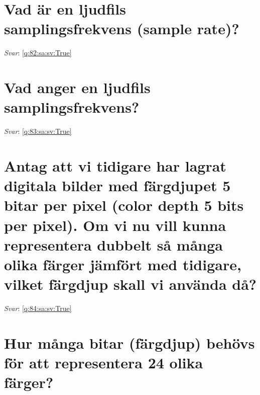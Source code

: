 \documentclass[a4paper,11pt,oneside]{book}
\begin{document}
\begin{sloppypar}
\section{Vad \"ar en ljudfils samplingsfrekvens (sample rate)?}

\label{q:82:sa:sv:False}

\vspace{2cm}

\noindent\makebox[\textwidth]{\hrulefill}

\vspace{1cm}

\textit{Svar}: \autoref{q:82:sa:sv:True}



\section{Vad anger en ljudfils samplingsfrekvens?}

\label{q:83:sa:sv:False}

\vspace{2cm}

\noindent\makebox[\textwidth]{\hrulefill}

\vspace{1cm}

\textit{Svar}: \autoref{q:83:sa:sv:True}



\section{Antag att vi tidigare har lagrat digitala bilder med f\"argdjupet 5 bitar per pixel (color depth 5 bits per pixel). Om vi nu vill kunna representera dubbelt s\r{a} m\r{a}nga olika f\"arger j\"amf\"ort med tidigare, vilket f\"argdjup skall vi anv\"anda d\r{a}?}

\label{q:84:sa:sv:False}

\vspace{2cm}

\noindent\makebox[\textwidth]{\hrulefill}

\vspace{1cm}

\textit{Svar}: \autoref{q:84:sa:sv:True}



\section{Hur m\r{a}nga bitar (f\"argdjup) beh\"ovs f\"or att representera 24 olika f\"arger?}


\end{sloppypar}
\end{document}
